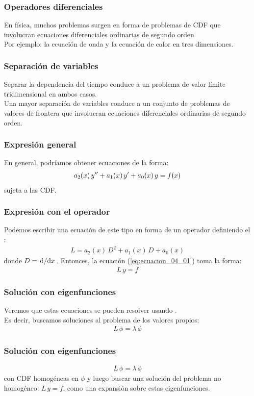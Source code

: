 \documentclass[12pt]{beamer}
\begin{document}
\begin{frame}
\frametitle{Operadores diferenciales}
En física, muchos problemas surgen en forma de problemas de CDF que involucran ecuaciones diferenciales ordinarias de segundo orden.
\\
\bigskip
\pause
Por ejemplo: la ecuación de onda y la ecuación de calor en tres dimensiones.
\end{frame}
\begin{frame}
\frametitle{Separación de variables}
Separar la dependencia del tiempo conduce a un problema de valor límite tridimensional en ambos casos.
\\
\bigskip
\pause
Una mayor separación de variables conduce a un conjunto de problemas de valores de frontera que involucran ecuaciones diferenciales ordinarias de segundo orden.
\end{frame}
\begin{frame}
\frametitle{Expresión general}
En general, podríamos obtener ecuaciones de la forma:
\pause
\begin{align}
a_{2} (x) \, {y}^{\prime \prime} + a_{1} (x) \, {y}^{\prime} + a_{0} (x) \, y = f(x)
\label{eq:ecuacion_04_01}
\end{align}
sujeta a las CDF.
\end{frame}
\begin{frame}
\frametitle{Expresión con el operador}
Podemos escribir una ecuación de este tipo en forma de un operador definiendo el :
\pause
\begin{align*}
L = a_{2} (x) \, D^{2} + a_{1} (x) \, D + a_{0} (x)
\end{align*}
donde $D = \dv*{x}$. \pause Entonces, la ecuación (\ref{eq:ecuacion_04_01}) toma la forma:
\begin{align*}
L \, y = f
\end{align*}
\end{frame}
\begin{frame}
\frametitle{Solución con eigenfunciones}
Veremos que estas ecuaciones se pueden resolver usando .
\\
\bigskip
\pause
Es decir, buscamos soluciones al problema de los valores propios:
\pause
\begin{align*}
L \, \phi = \lambda \, \phi
\end{align*}
\end{frame}
\begin{frame}
\frametitle{Solución con eigenfunciones}
\begin{align*}
L \, \phi = \lambda \, \phi
\end{align*}        
con CDF homogéneas en $\phi$ y luego buscar una solución del problema no homogéneo: $L \, y = f$, como una expansión sobre estas eigenfunciones.
\end{frame}
\end{document}
